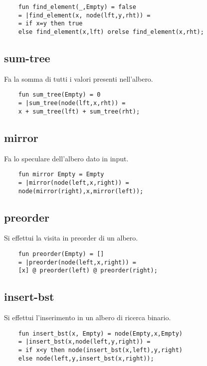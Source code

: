 \begin{lstlisting}
    fun find_element(_,Empty) = false
    = |find_element(x, node(lft,y,rht)) =
    = if x=y then true 
    else find_element(x,lft) orelse find_element(x,rht);

\end{lstlisting}

\subsection{sum-tree}

Fa la somma di tutti i valori presenti nell'albero.

\begin{lstlisting}
    fun sum_tree(Empty) = 0
    = |sum_tree(node(lft,x,rht)) =
    x + sum_tree(lft) + sum_tree(rht);
\end{lstlisting}

\subsection{mirror}

Fa lo speculare dell'albero dato in input.

\begin{lstlisting}
    fun mirror Empty = Empty
    = |mirror(node(left,x,right)) =
    node(mirror(right),x,mirror(left));
\end{lstlisting}

\subsection{preorder}

Si effettui la visita in preorder di un albero.

\begin{lstlisting}
    fun preorder(Empty) = []
    = |preorder(node(left,x,right)) =
    [x] @ preorder(left) @ preorder(right);
\end{lstlisting}

\subsection{insert-bst}

Si effettui l'inserimento in un albero di ricerca binario.

\begin{lstlisting}
    fun insert_bst(x, Empty) = node(Empty,x,Empty)
    = |insert_bst(x,node(left,y,right)) =
    = if x<y then node(insert_bst(x,left),y,right)
    else node(left,y,insert_bst(x,right));
\end{lstlisting}

